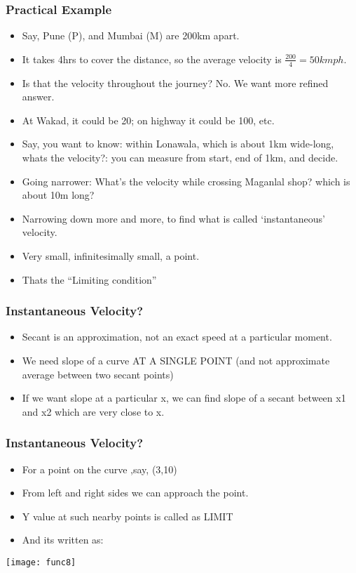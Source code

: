  \begin{frame}[fragile]\frametitle{Practical Example}
\begin{itemize}
\item Say, Pune (P), and Mumbai (M) are 200km apart.
\item It takes 4hrs to cover the distance, so the average velocity is $\frac{200}{4} = 50kmph$.
\item Is that the velocity throughout the journey? No. We want more refined answer.
\item At Wakad, it could be 20; on highway it could be 100, etc.
\item Say, you want to know: within Lonawala, which is about 1km wide-long, whats the velocity?: you can measure from start, end of 1km, and decide.
\item Going narrower: What's the velocity while crossing Maganlal shop? which is about 10m long?
\item Narrowing down more and more, to find what is called `instantaneous' velocity.
\item Very small, infinitesimally small, a point.
\item Thats the ``Limiting condition''
\end{itemize}
\end{frame}


 \begin{frame}[fragile]\frametitle{Instantaneous Velocity?}
\begin{itemize}
\item Secant is an approximation, not an exact speed at a particular moment.
\item We need slope of a curve AT A SINGLE POINT (and not approximate average between two secant points)
\item If we want slope at a particular x, we can find slope of a secant between x1 and x2 which are very close to x.
\end{itemize}
\end{frame}

 \begin{frame}[fragile]\frametitle{Instantaneous Velocity?}
\begin{itemize}
\item For a point on the curve ,say, (3,10)
\item From left and right sides we can approach the point.
\item Y value at such nearby points is called as LIMIT
\item And its written as:
\end{itemize}
\begin{center}
\texttt{[image: func8]}
\end{center}
\end{frame}


